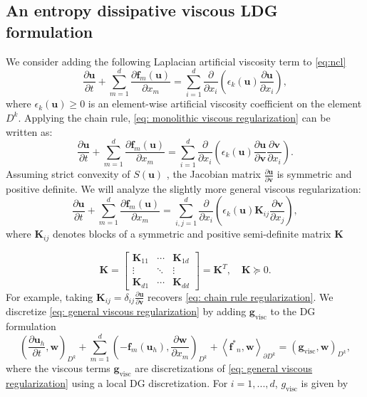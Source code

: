 \documentclass{elsarticle}
\theoremstyle{definition}
\theoremstyle{plain}
\theoremstyle{plain}
\newcommand{\pd}[2]{\frac{\partial#1}{\partial#2}}
\newcommand{\LRp}[1]{\left( #1 \right)} %
\newcommand{\LRa}[1]{\left\langle #1 \right\rangle} %
\newcommand{\refone}[1]{{\color{red}#1}}
\newcommand{\reftwo}[1]{{\color{blue}#1}}
\renewcommand{\refone}[1]{#1}
\renewcommand{\reftwo}[1]{#1}
\newcommand{\note}[1]{{\color{blue}{#1}}}
\begin{document}
\subsection{An entropy dissipative viscous LDG formulation}

We consider adding the following Laplacian artificial viscosity term to \eqref{eq:ncl}
\begin{equation}\label{eq: monolithic viscous regularization}
    \pd{\bm{u}}{t} + \sum_{m=1}^d \pd{\bm{f}_m(\bm{u})}{x_m} = \sum_{\reftwo{i = 1}}^d \pd{}{x_i}\left(\epsilon_k (\bm{u})\pd{\bm{u}}{\reftwo{x_i}} \right),
\end{equation}
where $\epsilon_k(\bm{u}) \geq 0$ \refone{is an element-wise artificial viscosity coefficient on the element $D^k$}. Applying the chain rule, \eqref{eq: monolithic viscous regularization} can be written as:
\begin{equation}\label{eq: chain rule regularization}
    \pd{\bm{u}}{t} + \sum_{m=1}^d \pd{\bm{f}_m(\bm{u})}{x_m} = \sum_{i = 1}^d \pd{}{x_i}\left(\epsilon_k(\bm{u})\pd{\bm{u}}{\bm{v}}\pd{\bm{v}}{x_i} \right).
\end{equation}
\reftwo{Assuming strict convexity} of $S(\bm{u})$ \cite{lukavcova2025note}, the Jacobian matrix $\pd{\bm{u}}{\bm{v}}$ is symmetric and positive definite. We will analyze the slightly more general viscous regularization:
\begin{equation}\label{eq: general viscous regularization}
\pd{\bm{u}}{t} + \sum_{m=1}^d \pd{\bm{f}_m(\bm{u})}{x_m} = \sum_{i,j = 1}^d \pd{}{x_i}\left(\epsilon_k(\bm{u})\bm{K}_{ij}\pd{\bm{v}}{x_j} \right),
\end{equation} 
where $\bm{K}_{ij}$ denotes blocks of a symmetric and positive semi-definite matrix $\bm{K}$

$$
\bm{K} = 
\begin{bmatrix}
    \bm{K}_{11} & \cdots & \bm{K}_{1d} \\
    \vdots      & \ddots & \vdots\\
    \bm{K}_{d1} & \cdots & \bm{K}_{dd}
\end{bmatrix} = \bm{K}^T, \quad \bm{K} \succeq 0.
$$
For example, taking $\bm{K}_{ij} = \delta_{ij} \pd{\bm{u}}{\bm{v}}$ recovers \eqref{eq: chain rule regularization}. We discretize \eqref{eq: general viscous regularization} by adding $\bm{g}_{\text{visc}}$ to the DG formulation %
\begin{equation}\label{eq: viscous DG formulation}
\LRp{\pd{\bm{u}_h}{t}, \bm{w} }_{D^k} + \sum_{m=1}^d \LRp{-\bm{f}_m(\bm{u}_{h}), \pd{\bm{w}}{x_m}}_{D^k} + \LRa{ \bm{f^{*}}_n,\bm{w}}_{\partial D^k} = \LRp{\bm{g}_{\text{visc}}, \bm{w}}_{D^k},
\end{equation}
where the viscous terms $\bm{g}_{\text{visc}}$ are discretizations of \eqref{eq: general viscous regularization} using a local DG discretization. \reftwo{For $i = 1,...,d$, $g_{\text{visc}}$ is given by} 
\end{document}
